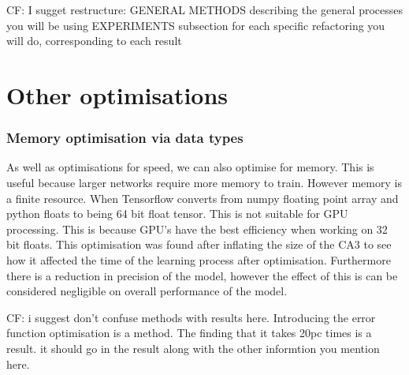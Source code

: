 
CF: I sugget restructure:
GENERAL METHODS
   describing the general processes you will be using
EXPERIMENTS
   subsection for each specific refactoring you will do, corresponding to each result






\section{Other optimisations}
\subsubsection{Memory optimisation via data types}
As well as optimisations for speed, we can also optimise for memory.
This is useful because larger networks require more memory to train.
However memory is a finite resource.
When Tensorflow converts from numpy floating point array and python floats to being 64 bit float tensor.
This is not suitable for GPU processing.
This is because GPU's have the best efficiency when working on 32 bit floats.
This optimisation was found after inflating the size of the CA3 to see how it affected the time of the learning process after optimisation.
Furthermore there is a reduction in precision of the model, however the effect of this is can be considered negligible on overall performance of the model. 






CF: i suggest don't confuse methods with results here.  Introducing the error function optimisation is a method. The finding that it takes 20pc times is a result. it should go in the result along with the other informtion you mention here.










